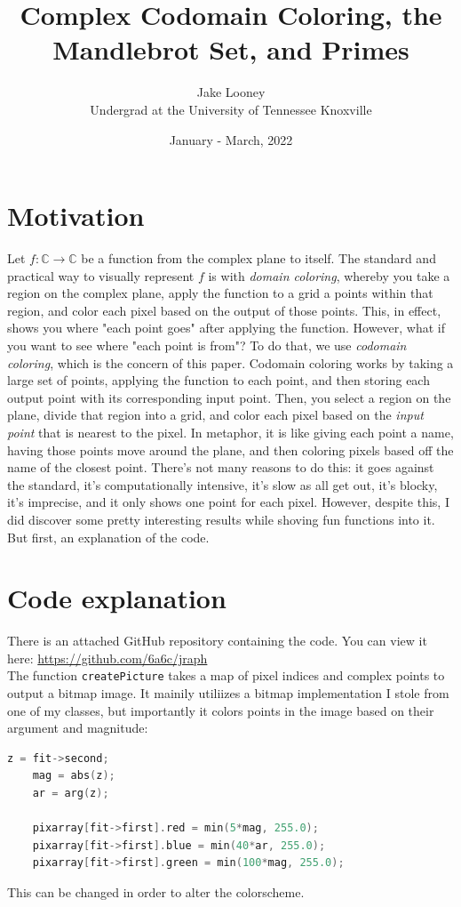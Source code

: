 \documentclass[letterpaper,12pt]{article}
\begin{document}
\title{Complex Codomain Coloring, the Mandlebrot Set, and Primes}
\author{Jake Looney\\ Undergrad at the University of Tennessee Knoxville}
\date{January - March, 2022}
\maketitle

\tableofcontents
\newpage
{}

\section{Motivation}
Let $f:\mathbb{C}\rightarrow\mathbb{C}$ be a function from the complex plane to itself.
The standard and practical way to visually represent $f$ is with \textit{domain coloring}, whereby you take a region
on the complex plane, apply the function to a grid a points within that region, and color each pixel based on the output of those points.
This, in effect, shows you where "each point goes" after applying the function. However, what if you want to see
where "each point is from"? To do that, we use \textit{codomain coloring}, which is the concern of this paper.
Codomain coloring works by taking a large set of points, applying the function to each point,
and then storing each output point with its corresponding input point. Then, you select a region on the plane,
divide that region into a grid, and color each pixel based on the \textit{input point} that is nearest to the pixel.
In metaphor, it is like giving each point a name, having those points move around the plane, and then coloring pixels based off
the name of the closest point.
There's not many reasons to do this: it goes against the standard, it's computationally intensive, it's slow as all get out, it's blocky, it's imprecise, and it only shows one point for each pixel.
However, despite this, I did discover some pretty interesting results while shoving fun functions into it. But first, an explanation of the code.

\section{Code explanation}
There is an attached GitHub repository containing the code. You can view it here: \url{https://github.com/6a6c/jraph} \\

The function \verb|createPicture| takes a map of pixel indices and complex points to output a bitmap image.
It mainily utiliizes a bitmap implementation I stole from one of my classes,
but importantly it colors points in the image based on their argument and magnitude:
\begin{lstlisting}[language=c++]
    z = fit->second;
    mag = abs(z);
    ar = arg(z);

    pixarray[fit->first].red = min(5*mag, 255.0);
    pixarray[fit->first].blue = min(40*ar, 255.0);
    pixarray[fit->first].green = min(100*mag, 255.0);
\end{lstlisting}
This can be changed in order to alter the colorscheme.\\
\end{document}
